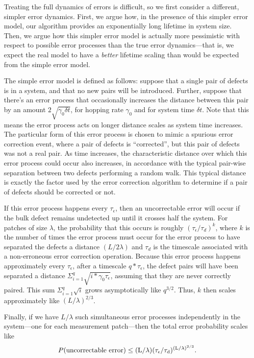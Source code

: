 \documentclass[twocolumn,superscriptaddress,aps,prb,floatfix]{revtex4-1}
\begin{document}
 Treating the full dynamics of errors is difficult, so we first consider a different, simpler error dynamics.  First, we argue how, in the presence of this simpler error model, our algorithm provides an exponentially long lifetime in system size.  Then, we argue how this simpler error model is actually more pessimistic with respect to possible error processes than the true error dynamics---that is, we expect the real model to have a \emph{better} lifetime scaling than would be expected from the simple error model.
 
 The simple error model is defined as follows:  suppose that a single pair of defects is in a system, and that no new pairs will be introduced.  Further, suppose that there's an error process that occasionally increases the distance between this pair by an amount $2\sqrt{\gamma_0 \delta t}$, for hopping rate $\gamma_0$ and for system time $\delta t$.  Note that this means the error process acts on longer distance scales as system time increases.  The particular form of this error process is chosen to mimic a spurious error correction event, where a pair of defects is ``corrected'', but this pair of defects was not a real pair.  As time increases, the characteristic distance over which this error process could occur also increases, in accordance with the typical pair-wise separation between two defects performing a random walk.  This typical distance is exactly the factor used by the error correction algorithm to determine if a pair of defects should be corrected or not.

 If this error process happens every $\tau_{\epsilon}$, then an uncorrectable error will occur if the bulk defect remains undetected up until it crosses half the system.  For patches of size $\lambda$, the probability that this occurs is roughly $(\tau_{\epsilon} / \tau_d)^{k}$, where $k$ is the number of times the error process must occur for the error process to have separated the defects a distance $(L/2\lambda)$ and $\tau_d$ is the timescale associated with a non-erroneous error correction operation.  Because this error process happens approximately every $\tau_{\epsilon}$, after a timescale $q*\tau_{\epsilon}$, the defect pairs will have been separated a distance $\Sigma^q_{i=1} \sqrt{i * \gamma_0 \tau_{\epsilon}}$, assuming that they are never correctly paired.  This sum $\Sigma^q_{i=1} \sqrt{i}$ grows asymptotically like $q^{3/2}$.  Thus, $k$ then scales approximately like $(L/\lambda)^{2/3}$.
 
 Finally, if we have $L/\lambda$ such simultaneous error processes independently in the system---one for each measurement patch---then the total error probability scales like
\begin{align}
\label{eq:err_scaling}
 P(\rm{uncorrectable\ error}) \leq (L/\lambda) (\tau_{\epsilon} / \tau_d)^{(L/\lambda)^{2/3}}.
\end{align}
\end{document}
